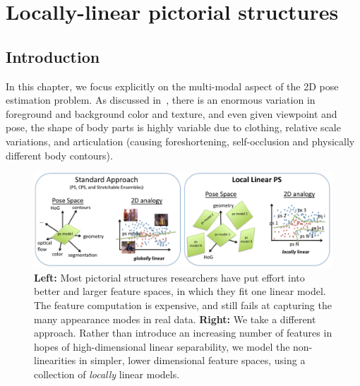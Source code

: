 \chapter{Locally-linear pictorial structures}\label{sec:llps}
\section{Introduction}

In this chapter, we focus explicitly on the multi-modal aspect of the 2D pose 
estimation problem.  As discussed in~, there is an enormous 
variation in foreground and background color and texture, and even given 
viewpoint and pose, the shape of body parts is highly variable due to clothing, 
relative scale variations, and articulation (causing foreshortening, 
self-occlusion and physically different body contours).

\begin{figure}[t!]
\centering
\includegraphics[width=0.99\linewidth]{figs/llps-overview.pdf}
\caption[LLPS overview.]{\label{fig:overview} \textbf{Left:} Most pictorial 
structures researchers have put effort into better and larger feature spaces, 
in which they fit one linear model.  The feature computation is expensive, and
still fails at capturing the many appearance modes in real data.  
\textbf{Right:} We take a different approach.  Rather than introduce an 
increasing number of features in hopes of high-dimensional linear separability, 
we model the non-linearities in simpler, lower dimensional feature spaces, 
using a collection of {\em locally} linear models.}
\end{figure}


